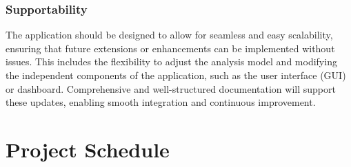 \documentclass{article}
\begin{document}
\subsubsection{Supportability}
The application should be designed to allow for seamless and easy scalability, ensuring that future extensions or enhancements can be implemented without issues. This includes the flexibility to adjust the analysis model and modifying the independent components of the application, such as the user interface (GUI) or dashboard. Comprehensive and well-structured documentation will support these updates, enabling smooth integration and continuous improvement.

\pagebreak
\section{Project Schedule}
\end{document}
